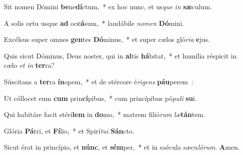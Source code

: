 ﻿\item Sit nomen Dómini \textbf{be}\-ne\textbf{dí}\-ctum,~* ex hoc nunc, et us\-\emph{que} \emph{in} \textbf{sæ}culum.
\item A solis ortu usque \textbf{ad} oc\textbf{cá}\-sum,~* laudábile \emph{no}\-\emph{men} \textbf{Dó}mini.
\item Excélsus super omnes \textbf{gen}\-tes \textbf{Dó}\-minus,~* et super cælos gló\-\emph{ri}\-\emph{a} \textbf{e}jus.
\item Quis sicut Dóminus, Deus noster, qui in \textbf{al}\-tis \textbf{há}\-bitat,~* et humília réspicit in cælo \emph{et} \emph{in} \textbf{ter}ra?
\item Súscitans a \textbf{ter}\-ra \textbf{ín}\-opem,~* et de stércore é\emph{ri}\-\emph{gens} \textbf{páu}perem~:
\item Ut cóllocet eum \textbf{cum} prin\textbf{cí}\-pibus,~* cum princípibus pó\-\emph{pu}\-\emph{li} \textbf{su}i.
\item Qui habitáre facit stéri\textbf{lem} in \textbf{do}\-mo,~* matrem fi\-li\-ó\-\emph{rum} \emph{læ}\textbf{tán}tem.
\item Glória \textbf{Pá}\-tri, et \textbf{Fí}\-lio,~* et Spirí\emph{tu}\-\emph{i} \textbf{Sán}cto.
\item Sicut érat in princípio, et \textbf{núnc}, et \textbf{sém}\-per,~* et in saécula sæcu\emph{ló}\-\emph{rum}. \textbf{A}men.